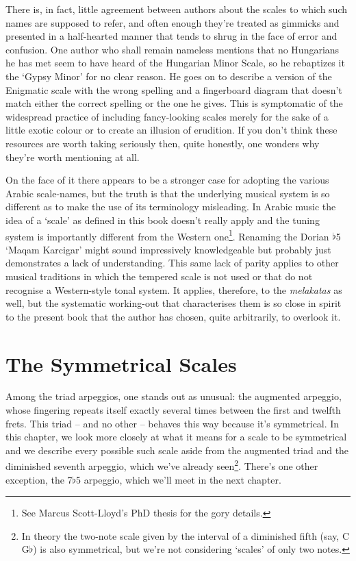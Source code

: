 \documentclass[english]{./gbook}
\begin{document}
\begin{large}
There is, in fact, little agreement between authors about the scales to which such names are supposed to refer, and often enough they're treated as gimmicks and presented in a half-hearted manner that tends to shrug in the face of error and confusion. One author who shall remain nameless mentions that no Hungarians he has met seem to have heard of the Hungarian Minor Scale, so he rebaptizes it the `Gypsy Minor' for no clear reason. He goes on to describe a version of the Enigmatic scale with the wrong spelling and a fingerboard diagram that doesn't match either the correct spelling or the one he gives. This is symptomatic of the widespread practice of including fancy-looking scales merely for the sake of a little exotic colour or to create an illusion of erudition. If you don't think these resources are worth taking seriously then, quite honestly, one wonders why they're worth mentioning at all.

On the face of it there appears to be a stronger case for adopting the various Arabic scale-names, but the truth is that the underlying musical system is so different as to make the use of its terminology misleading. In Arabic music the idea of a `scale' as defined in this book doesn't really apply and the tuning system is importantly different from the Western one\footnote{See Marcus Scott-Lloyd's PhD thesis for the gory details.}. Renaming the Dorian $\flat$5 `Maqam Karcigar' might sound impressively knowledgeable but probably just demonstrates a lack of understanding. This same lack of parity applies to other musical traditions in which the tempered scale is not used or that do not recognise a Western-style tonal system. It applies, therefore, to the \emph{melakatas} as well, but the systematic working-out that characterises them is so close in spirit to the present book that the author has chosen, quite arbitrarily, to overlook it.


\chapter{\mbox{The} \mbox{Symmetrical} \mbox{Scales}}

Among the triad arpeggios, one stands out as unusual: the augmented arpeggio, whose fingering repeats itself exactly several times between the first and twelfth frets. This triad -- and no other -- behaves this way because it's symmetrical. In this chapter, we look more closely at what it means for a scale to be symmetrical and we describe every possible such scale aside from the augmented triad and the diminished seventh arpeggio, which we've already seen\footnote{In theory the two-note scale given by the interval of a diminished fifth (say, C G$\flat$) is also symmetrical, but we're not considering `scales' of only two notes.}. There's one other exception, the 7$\flat$5 arpeggio, which we'll meet in the next chapter.


\end{large}
\end{document}
